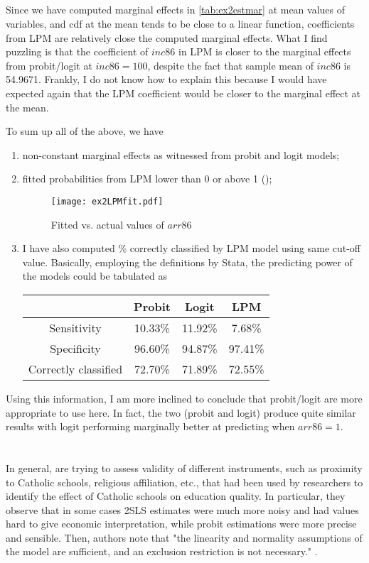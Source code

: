 \documentclass[]{article}
\begin{document}
\subsection{}
Since we have computed marginal effects in \cref{tab:ex2estmar} at mean values of variables, and cdf at the mean tends to be close to a linear function, coefficients from LPM are relatively close the computed marginal effects. What I find puzzling is that the coefficient of $inc86$ in LPM is closer to the marginal effects from probit/logit at $inc86 = 100$, despite the fact that sample mean of $inc86$ is 54.9671. Frankly, I do not know how to explain this because I would have expected again that the LPM coefficient would be closer to the marginal effect at the mean.

To sum up all of the above, we have
\begin{enumerate}[label=\roman*)]
	\item non-constant marginal effects as witnessed from probit and logit models;
	\item fitted probabilities from LPM lower than 0 or above 1 ();
	\begin{figure}[h]
		\centering
		\texttt{[image: ex2LPMfit.pdf]}
		\caption{Fitted vs. actual values of $arr86$}
		\label{fig:ex2LPMfit}
	\end{figure}
	\item I have also computed \% correctly classified by LPM model using same cut-off value. Basically, employing the definitions by Stata, the predicting power of the models could be tabulated as
	\begin{table}[h]
		\centering
		\begin{tabular}{c|ccc}
			 & Probit & Logit & LPM \\ \hline
			Sensitivity & 10.33\% & 11.92\% & 7.68\% \\
			Specificity & 96.60\% & 94.87\% & 97.41\% \\
			Correctly classified & 72.70\% & 71.89\% & 72.55\%
		\end{tabular}
	\end{table}
\end{enumerate}

Using this information, I am more inclined to conclude that probit/logit are more appropriate to use here. In fact, the two (probit and logit) produce quite similar results with logit performing marginally better at predicting when $arr86 = 1$.

\section{}
In general, \textcite{AET_2005} are trying to assess validity of different instruments, such as proximity to Catholic schools, religious affiliation, etc., that had been used by researchers to identify the effect of Catholic schools on education quality. In particular, they observe that in some cases 2SLS estimates were much more noisy and had values hard to give economic interpretation, while probit estimations were more precise and sensible. Then, authors note that "the linearity and normality assumptions of the model are sufficient, and an exclusion restriction is not necessary." \autocite{AET_2005}.
\end{document}
